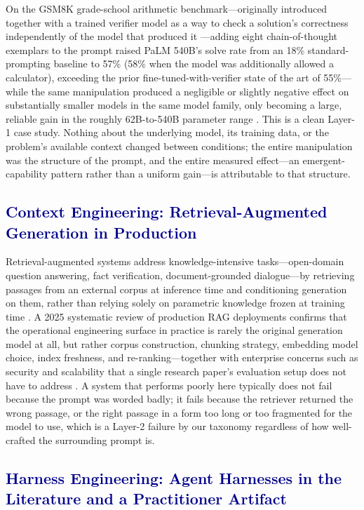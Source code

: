 \documentclass[journal]{IEEEtran}
\begin{document}
On the GSM8K grade-school arithmetic benchmark---originally introduced together with a trained verifier model as a way to check a solution's correctness independently of the model that produced it \cite{cobbe2021training}---adding eight chain-of-thought exemplars to the prompt raised PaLM 540B's solve rate from an 18\% standard-prompting baseline to 57\% (58\% when the model was additionally allowed a calculator), exceeding the prior fine-tuned-with-verifier state of the art of 55\%---while the same manipulation produced a negligible or slightly negative effect on substantially smaller models in the same model family, only becoming a large, reliable gain in the roughly 62B-to-540B parameter range \cite{wei2022chain}. This is a clean Layer-1 case study. Nothing about the underlying model, its training data, or the problem's available context changed between conditions; the entire manipulation was the structure of the prompt, and the entire measured effect---an emergent-capability pattern rather than a uniform gain---is attributable to that structure.

\subsection{\textcolor{darkblue}{Context Engineering: Retrieval-Augmented Generation in Production}}

Retrieval-augmented systems address knowledge-intensive tasks---open-domain question answering, fact verification, document-grounded dialogue---by retrieving passages from an external corpus at inference time and conditioning generation on them, rather than relying solely on parametric knowledge frozen at training time \cite{lewis2020retrieval}. A 2025 systematic review of production RAG deployments confirms that the operational engineering surface in practice is rarely the original generation model at all, but rather corpus construction, chunking strategy, embedding model choice, index freshness, and re-ranking---together with enterprise concerns such as security and scalability that a single research paper's evaluation setup does not have to address \cite{oche2025systematic}. A system that performs poorly here typically does not fail because the prompt was worded badly; it fails because the retriever returned the wrong passage, or the right passage in a form too long or too fragmented for the model to use, which is a Layer-2 failure by our taxonomy regardless of how well-crafted the surrounding prompt is.

\subsection{\textcolor{darkblue}{Harness Engineering: Agent Harnesses in the Literature and a Practitioner Artifact}}
\end{document}
